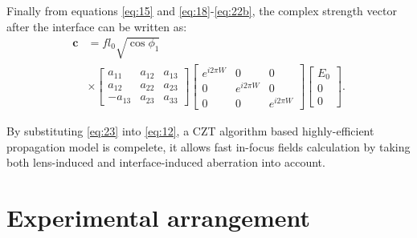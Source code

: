 \documentclass[9pt,twocolumn,twoside]{osajnl}
\begin{document}
Finally from equations \eqref{eq:15} and \eqref{eq:18}-\eqref{eq:22b}, the complex strength vector after the interface can be written as:
	\begin{equation}
		\begin{aligned}\label{eq:23}
			\mathbf{c}&=f l_0\sqrt{\cos\phi_1}\\
			&\times\begin{bmatrix}
				a_{11} & a_{12} & a_{13}\\
				a_{12} & a_{22} & a_{23}\\
				-a_{13} & a_{23} & a_{33}
				\end{bmatrix}
				\begin{bmatrix}
					e^{i2\pi W}&0&0\\
					0&e^{i2\pi W}&0\\
					0&0&e^{i2\pi W}
				\end{bmatrix}
				\begin{bmatrix}
					E_0\\
					0\\
					0
				\end{bmatrix}.
		\end{aligned}
	\end{equation}	

By substituting \eqref{eq:23} into \eqref{eq:12}, a CZT algorithm based highly-efficient propagation model is compelete, it allows fast in-focus fields calculation by taking both lens-induced and interface-induced aberration into account.

\section{Experimental arrangement}
\end{document}
